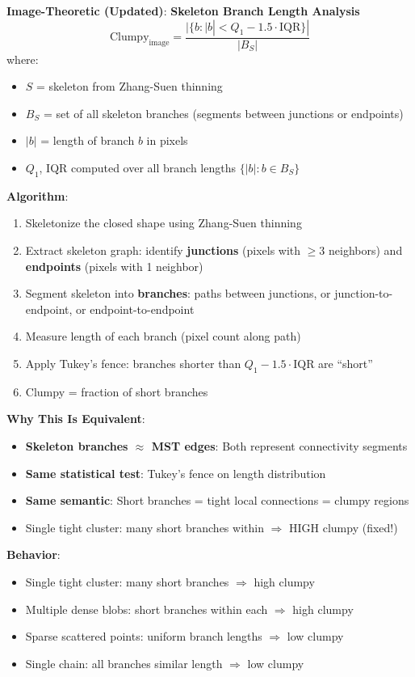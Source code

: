 \documentclass[11pt]{article}
\begin{document}
\textbf{Image-Theoretic (Updated)}: \textbf{Skeleton Branch Length Analysis}
\begin{equation}
    \text{Clumpy}_{\text{image}} = \frac{|\{b : |b| < Q_1 - 1.5 \cdot \text{IQR}\}|}{|B_S|}
\end{equation}
where:
\begin{itemize}
    \item $S$ = skeleton from Zhang-Suen thinning
    \item $B_S$ = set of all skeleton branches (segments between junctions or endpoints)
    \item $|b|$ = length of branch $b$ in pixels
    \item $Q_1$, IQR computed over all branch lengths $\{|b| : b \in B_S\}$
\end{itemize}

\textbf{Algorithm}:
\begin{enumerate}
    \item Skeletonize the closed shape using Zhang-Suen thinning
    \item Extract skeleton graph: identify \textbf{junctions} (pixels with $\geq 3$ neighbors) and \textbf{endpoints} (pixels with 1 neighbor)
    \item Segment skeleton into \textbf{branches}: paths between junctions, or junction-to-endpoint, or endpoint-to-endpoint
    \item Measure length of each branch (pixel count along path)
    \item Apply Tukey's fence: branches shorter than $Q_1 - 1.5 \cdot \text{IQR}$ are ``short''
    \item Clumpy = fraction of short branches
\end{enumerate}

\textbf{Why This Is Equivalent}:
\begin{itemize}
    \item \textbf{Skeleton branches $\approx$ MST edges}: Both represent connectivity segments
    \item \textbf{Same statistical test}: Tukey's fence on length distribution
    \item \textbf{Same semantic}: Short branches = tight local connections = clumpy regions
    \item Single tight cluster: many short branches within $\Rightarrow$ HIGH clumpy (fixed!)
\end{itemize}

\textbf{Behavior}:
\begin{itemize}
    \item Single tight cluster: many short branches $\Rightarrow$ high clumpy
    \item Multiple dense blobs: short branches within each $\Rightarrow$ high clumpy
    \item Sparse scattered points: uniform branch lengths $\Rightarrow$ low clumpy
    \item Single chain: all branches similar length $\Rightarrow$ low clumpy
\end{itemize}
\end{document}
